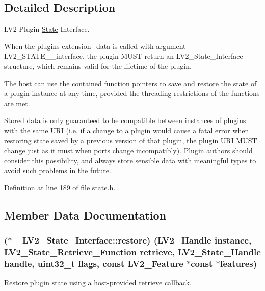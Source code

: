 \subsection{Detailed Description}
L\+V2 Plugin \hyperlink{struct_state}{State} Interface.

When the plugin\textquotesingle{}s extension\+\_\+data is called with argument L\+V2\+\_\+\+S\+T\+A\+T\+E\+\_\+\+\_\+interface, the plugin M\+U\+ST return an L\+V2\+\_\+\+State\+\_\+\+Interface structure, which remains valid for the lifetime of the plugin.

The host can use the contained function pointers to save and restore the state of a plugin instance at any time, provided the threading restrictions of the functions are met.

Stored data is only guaranteed to be compatible between instances of plugins with the same U\+RI (i.\+e. if a change to a plugin would cause a fatal error when restoring state saved by a previous version of that plugin, the plugin U\+RI M\+U\+ST change just as it must when ports change incompatibly). Plugin authors should consider this possibility, and always store sensible data with meaningful types to avoid such problems in the future. 

Definition at line 189 of file state.\+h.



\subsection{Member Data Documentation}
\subsubsection[{\texorpdfstring{restore}{restore}}]{($\ast$ \+\_\+\+L\+V2\+\_\+\+State\+\_\+\+Interface\+::restore) ({\bf L\+V2\+\_\+\+Handle} instance, {\bf L\+V2\+\_\+\+State\+\_\+\+Retrieve\+\_\+\+Function} retrieve, {\bf L\+V2\+\_\+\+State\+\_\+\+Handle} handle, {\bf uint32\+\_\+t} flags, {\bf const} {\bf L\+V2\+\_\+\+Feature} $\ast${\bf const} $\ast$features)}\hypertarget{struct___l_v2___state___interface_af1b48ea50175bfef63d4dd35d09d90b8}{}\label{struct___l_v2___state___interface_af1b48ea50175bfef63d4dd35d09d90b8}
Restore plugin state using a host-\/provided {\ttfamily retrieve} callback.


